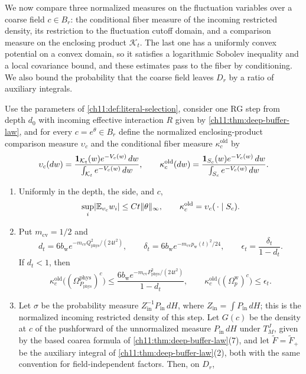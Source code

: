 We now compare three normalized measures on the fluctuation variables over a coarse field $c\in B_r$: the conditional fiber measure of the incoming restricted density, its restriction to the fluctuation cutoff domain, and a comparison measure on the enclosing product $\mathcal K_t$. The last one has a uniformly convex potential on a convex domain, so it satisfies a logarithmic Sobolev inequality and a local covariance bound, and these estimates pass to the fiber by conditioning. We also bound the probability that the coarse field leaves $D_r$ by a ratio of auxiliary integrals.

\begin{theorem}\label{ch11:thm:admitted-white-comparison}
Use the parameters of \cref{ch11:def:literal-selection}, consider one RG step from depth $d_0$ with incoming effective interaction $R$ given by \cref{ch11:thm:deep-buffer-law}, and for every $c=e^\theta\in B_r$ define the normalized enclosing-product comparison measure $\upsilon_c$ and the conditional fiber measure $\kappa_c^{\mathrm{old}}$ by
\[
 \upsilon_c(dw)=\frac{\mathbf 1_{\mathcal K_t}(w)e^{-V_c(w)}\,dw}{\int_{\mathcal K_t}e^{-V_c(w)}\,dw},\qquad
 \kappa_c^{\mathrm{old}}(dw)=\frac{\mathbf 1_{S_c}(w)e^{-V_c(w)}\,dw}{\int_{S_c}e^{-V_c(w)}\,dw}.
\]
\begin{enumerate}
\item Uniformly in the depth, the side, and $c$,
\[
 \sup_i\lvert \mathbb E_{\upsilon_c}w_i\rvert\le Ct\lVert \theta\rVert_\infty,\qquad
 \kappa_c^{\mathrm{old}}=\upsilon_c(\,\cdot\mid S_c).
\]
\item Put $m_{\mathrm{cv}}=1/2$ and
\[
 d_t=6b_{\mathrm w}e^{-m_{\mathrm{cv}}Q_{\mathrm{phys}}^2/(24t^2)},\qquad
 \delta_t=6b_{\mathrm w}e^{-m_{\mathrm{cv}}p_{\mathrm w}(t)^2/24},\qquad
 \epsilon_t=\frac{\delta_t}{1-d_t}.
\]
If $d_t<1$, then
\[
 \kappa_c^{\mathrm{old}}\bigl((\Omega_{P_{\mathrm{phys}}}^{\mathrm{phys}})^c\bigr)
 \le\frac{6b_{\mathrm w}e^{-m_{\mathrm{cv}}P_{\mathrm{phys}}^2/(24t^2)}}{1-d_t},
 \qquad
 \kappa_c^{\mathrm{old}}\bigl((\Omega_p^{\mathrm w})^c\bigr)\le\epsilon_t.
\]
\item Let $\sigma$ be the probability measure $Z_{\mathrm{in}}^{-1}P_{\mathrm{in}}\,dH$, where $Z_{\mathrm{in}}=\int P_{\mathrm{in}}\,dH$; this is the normalized incoming restricted density of this step. Let $G(c)$ be the density at $c$ of the pushforward of the unnormalized measure $P_{\mathrm{in}}\,dH$ under $T_M^J$, given by the based coarea formula of \cref{ch11:thm:deep-buffer-law}(7), and let $\widetilde F=\widetilde F_+$ be the auxiliary integral of \cref{ch11:thm:deep-buffer-law}(2), both with the same convention for field-independent factors. Then, on $D_r$,

\end{enumerate}
\end{theorem}

